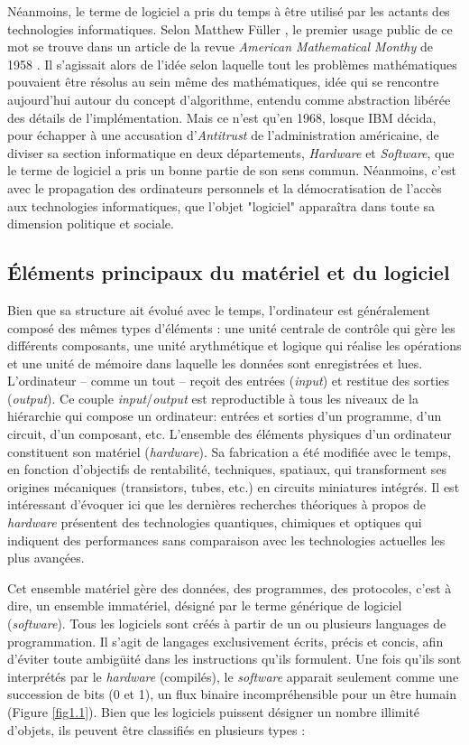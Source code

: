 Néanmoins, le terme de logiciel a pris du temps à être utilisé par les actants des technologies informatiques. Selon Matthew Füller \citep{Fuller2008}, le premier usage public de ce mot se trouve dans un article de la revue \emph{American Mathematical Monthy} de 1958 \citep{Tukey1958}. Il s'agissait alors de l'idée selon laquelle tout les problèmes mathématiques pouvaient être résolus au sein même des mathématiques, idée qui se rencontre aujourd'hui autour du concept d'algorithme, entendu comme abstraction libérée des détails de l'implémentation. Mais ce n'est qu'en 1968, losque IBM décida, pour échapper à une accusation d'\emph{Antitrust} de l'administration américaine, de diviser sa section informatique en deux départements, \emph{Hardware} et \emph{Software}, que le terme de logiciel a pris un bonne partie de son sens commun. Néanmoins, c'est avec le propagation des ordinateurs personnels et la démocratisation de l'accès aux technologies informatiques, que l'objet "logiciel" apparaîtra dans toute sa dimension politique et sociale.

\subsection{\'Eléments principaux du matériel et du logiciel} \label{1.1.2}

Bien que sa structure ait évolué avec le temps, l'ordinateur est généralement composé des mêmes types d'éléments : une unité centrale de contrôle qui gère les différents composants, une unité arythmétique et logique qui réalise les opérations et une unité de mémoire dans laquelle les données sont enregistrées et lues. L'ordinateur -- comme un tout -- reçoit des entrées (\emph{input}) et restitue des sorties (\emph{output}). Ce couple \emph{input}/\emph{output} est reproductible à tous les niveaux de la hiérarchie qui compose un ordinateur: entrées et sorties d'un programme, d'un circuit, d'un composant, etc. L'ensemble des éléments physiques d'un ordinateur constituent son matériel (\emph{hardware}). Sa fabrication a été modifiée avec le temps, en fonction d'objectifs de rentabilité, techniques, spatiaux, qui transforment ses origines mécaniques (transistors, tubes, etc.) en circuits miniatures intégrés. Il est intéressant d'évoquer ici que les dernières recherches théoriques à propos de \emph{hardware} présentent des technologies quantiques, chimiques et optiques qui indiquent des performances sans comparaison avec les technologies actuelles les plus avançées.

Cet ensemble matériel gère des données, des programmes, des protocoles, c'est à dire, un ensemble immatériel, désigné par le terme générique de logiciel (\emph{software}). Tous les logiciels sont créés à partir de un ou plusieurs languages de programmation. Il s'agit de langages exclusivement écrits, précis et concis, afin d'éviter toute ambig\"uité dans les instructions qu'ils formulent. Une fois qu'ils sont interprétés par le \emph{hardware} (compilés), le \emph{software} apparait seulement comme une succession de bits (0 et 1), un flux binaire incompréhensible pour un être humain (Figure \ref{fig1.1}). Bien que les logiciels puissent désigner un nombre illimité d'objets, ils peuvent être classifiés en plusieurs types :

